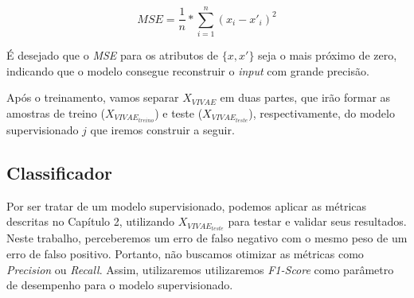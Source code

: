 \begin{equation}
    MSE = \frac{1}{n} * \sum^n_{i=1} (x_i - x'_i)^2
\end{equation}

É desejado que o \textit{MSE} para os atributos de $\{x, x'\}$ seja o mais próximo de zero, indicando que o modelo consegue reconstruir o \textit{input} com grande precisão.

Após o treinamento, vamos separar $X_{VIVAE}$ em duas partes, que irão formar as amostras de treino ($X_{VIVAE_{treino}}$) e teste ($X_{VIVAE_{teste}}$), respectivamente, do modelo supervisionado $j$ que iremos construir a seguir.

\subsection{Classificador}

Por ser tratar de um modelo supervisionado, podemos aplicar as métricas descritas no Capítulo 2, utilizando $X_{VIVAE_{teste}}$ para testar e validar seus resultados. Neste trabalho, perceberemos um erro de  falso negativo com o mesmo peso de um erro de falso positivo. Portanto, não buscamos otimizar as métricas como \textit{Precision} ou \textit{Recall}. Assim, utilizaremos utilizaremos \textit{F1-Score} como parâmetro de desempenho para o modelo supervisionado.
